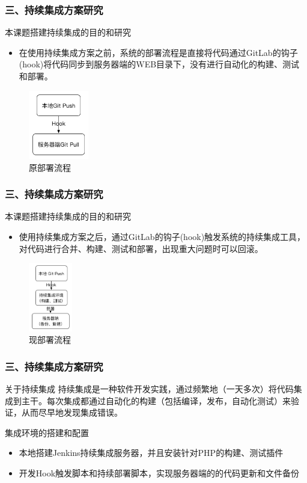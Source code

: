 \documentclass{beamer}
\begin{document}
\begin{frame}
\frametitle{三、持续集成方案研究}
  \begin{block}{本课题搭建持续集成的目的和研究}
    \begin{itemize}
      \item 在使用持续集成方案之前，系统的部署流程是直接将代码通过GitLab的钩子(hook)将代码同步到服务器端的WEB目录下，没有进行自动化的构建、测试和部署。
    \end{itemize} 
  \end{block}
  \begin{figure}
    \centering
      \includegraphics[height=3cm]{./img/jenkins1.png}
    \caption{原部署流程}
    \label{fig:visual}
  \end{figure}
\end{frame}

\begin{frame}
\frametitle{三、持续集成方案研究}
  \begin{block}{本课题搭建持续集成的目的和研究}
    \begin{itemize}
      \item 使用持续集成方案之后，通过GitLab的钩子(hook)触发系统的持续集成工具，对代码进行合并、构建、测试和部署，出现重大问题时可以回滚。
    \end{itemize} 
  \end{block}
  \begin{figure}
    \centering
      \includegraphics[height=3cm]{./img/jenkins2.png}
    \caption{现部署流程}
    \label{fig:visual}
  \end{figure}
\end{frame}

\begin{frame}
\frametitle{三、持续集成方案研究}
  \begin{block}{关于持续集成}
    持续集成是一种软件开发实践，通过频繁地（一天多次）将代码集成到主干。每次集成都通过自动化的构建（包括编译，发布，自动化测试）来验证，从而尽早地发现集成错误\cite{jenkins1}。
  \end{block}
  \begin{block}{集成环境的搭建和配置}
    \begin{itemize}
      \item 本地搭建Jenkins持续集成服务器，并且安装针对PHP的构建、测试插件
      \item 开发Hook触发脚本和持续部署脚本，实现服务器端的的代码更新和文件备份 
    \end{itemize} 
  \end{block}
\end{frame}
\end{document}

